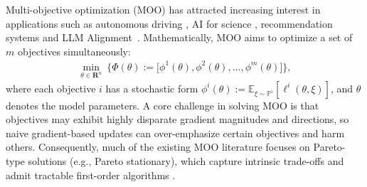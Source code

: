 \documentclass[twoside]{article} %
\def\eqref#1{equation~\ref{#1}}
\theoremstyle{plain}
\theoremstyle{definition}
\theoremstyle{remark}
\begin{document}

Multi-objective optimization (MOO) has attracted increasing interest in applications such as autonomous driving \citep{automativedriving}, AI for science \citep{ai4science}, recommendation systems \citep{recommendation} and LLM Alignment~\citep{RACO}. Mathematically, MOO aims to optimize a set of \(m\) objectives simultaneously:
\begin{align}
    \min_{\theta \in \mathbf{R}^n}\ \Big\{\Phi(\theta):=\big[\phi^1(\theta),\phi^2(\theta),\ldots,\phi^m(\theta)\big]\Big\},\label{eq: MOO}
\end{align}
where each objective $i$ has a stochastic form \(\phi^i(\theta):=\mathbb{E}_{\xi\sim\mathbb{P}^i}[\ell^i(\theta,\xi)]\), and \(\theta\) denotes the model parameters.
A core challenge in solving MOO is that objectives may exhibit highly disparate gradient magnitudes and directions, so naive gradient-based updates can over-emphasize certain objectives and harm others. Consequently, much of the existing MOO literature focuses on Pareto-type solutions (e.g., Pareto stationary), which capture intrinsic trade-offs and admit tractable first-order algorithms \citep{1stempiricalMGDAwork,paretoMTL,stochasticMGDA}.
\end{document}
